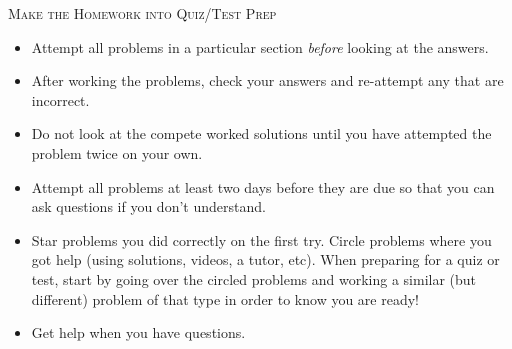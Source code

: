 \documentclass[11pt,fleqn]{article}
\begin{document}
\noindent \textsc{Make the Homework into Quiz/Test Prep}
\begin{itemize}
\item Attempt all problems in a particular section \textit{before} looking at the answers.
\item After working the problems, check your answers and re-attempt any that are incorrect.
\item Do not look at the compete worked solutions until you have attempted the problem twice on your own. 
\item Attempt all problems at least two days before they are due so that you can ask questions if you don't understand.
\item Star problems you did correctly on the first try. Circle problems where you got help (using solutions, videos, a tutor, etc). When preparing for a quiz or test, start by going over the circled problems and working a similar (but different) problem of that type in order to know you are ready!
\item Get help when you have questions.
\end{itemize}

\newpage
\end{document}
